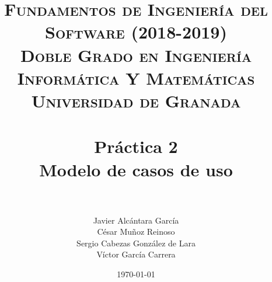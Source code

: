 


\graphicspath{{images/}}


\title{	
\normalfont \normalsize 
\textsc{\textbf{Fundamentos de Ingeniería del Software (2018-2019)} \\ Doble Grado en Ingeniería Informática Y Matemáticas \\ Universidad de Granada} \\ [25pt] %
\horrule{0.5pt} \\[0.4cm] %
\huge \textbf{Práctica 2} \\ Modelo de casos de uso \\ %
\horrule{2pt} \\[0.5cm] %
}

\author{Javier Alcántara García\\ César Muñoz Reinoso \\ Sergio Cabezas González de Lara \\ Víctor García Carrera} %

\date{\normalsize\today} %





\maketitle %

\newpage %

\tableofcontents %

\newpage

